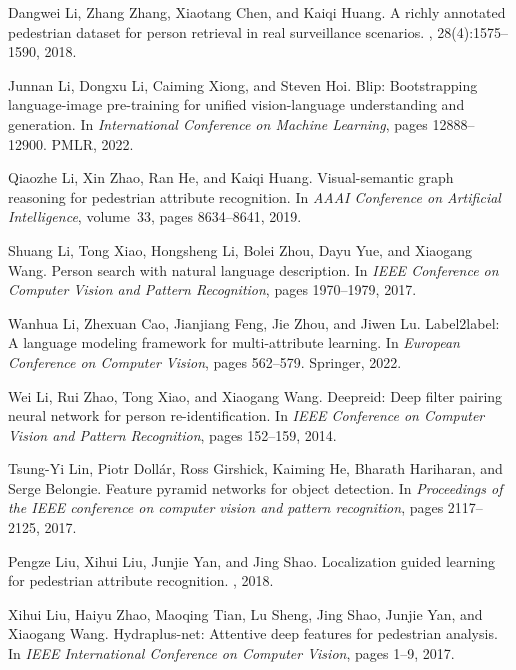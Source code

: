 \documentclass[10pt,twocolumn,letterpaper]{article}
\begin{document}
\begin{thebibliography}{10}
Dangwei Li, Zhang Zhang, Xiaotang Chen, and Kaiqi Huang.
\newblock A richly annotated pedestrian dataset for person retrieval in real
  surveillance scenarios.
, 28(4):1575--1590, 2018.

Junnan Li, Dongxu Li, Caiming Xiong, and Steven Hoi.
\newblock Blip: Bootstrapping language-image pre-training for unified
  vision-language understanding and generation.
\newblock In {\em International Conference on Machine Learning}, pages
  12888--12900. PMLR, 2022.

Qiaozhe Li, Xin Zhao, Ran He, and Kaiqi Huang.
\newblock Visual-semantic graph reasoning for pedestrian attribute recognition.
\newblock In {\em AAAI Conference on Artificial Intelligence}, volume~33, pages
  8634--8641, 2019.

Shuang Li, Tong Xiao, Hongsheng Li, Bolei Zhou, Dayu Yue, and Xiaogang Wang.
\newblock Person search with natural language description.
\newblock In {\em IEEE Conference on Computer Vision and Pattern Recognition},
  pages 1970--1979, 2017.

Wanhua Li, Zhexuan Cao, Jianjiang Feng, Jie Zhou, and Jiwen Lu.
\newblock Label2label: A language modeling framework for multi-attribute
  learning.
\newblock In {\em European Conference on Computer Vision}, pages 562--579.
  Springer, 2022.

Wei Li, Rui Zhao, Tong Xiao, and Xiaogang Wang.
\newblock Deepreid: Deep filter pairing neural network for person
  re-identification.
\newblock In {\em IEEE Conference on Computer Vision and Pattern Recognition},
  pages 152--159, 2014.

Tsung-Yi Lin, Piotr Doll{\'a}r, Ross Girshick, Kaiming He, Bharath Hariharan,
  and Serge Belongie.
\newblock Feature pyramid networks for object detection.
\newblock In {\em Proceedings of the IEEE conference on computer vision and
  pattern recognition}, pages 2117--2125, 2017.

Pengze Liu, Xihui Liu, Junjie Yan, and Jing Shao.
\newblock Localization guided learning for pedestrian attribute recognition.
, 2018.

Xihui Liu, Haiyu Zhao, Maoqing Tian, Lu Sheng, Jing Shao, Junjie Yan, and
  Xiaogang Wang.
\newblock Hydraplus-net: Attentive deep features for pedestrian analysis.
\newblock In {\em IEEE International Conference on Computer Vision}, pages
  1--9, 2017.


\end{thebibliography}
\end{document}
